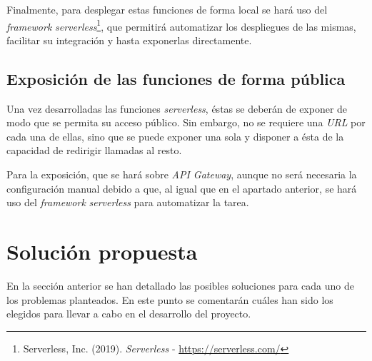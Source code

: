 \documentclass[11pt,spanish,listoffigures]{tfgetsinf}
\begin{document}
Finalmente, para desplegar estas funciones de forma local se hará uso del \textit{framework} \textit{serverless}\footnote{Serverless, Inc. (2019). \textit{Serverless} - \url{https://serverless.com/}}, que permitirá automatizar los despliegues de las mismas, facilitar su integración y hasta exponerlas directamente.

\subsection{Exposición de las funciones de forma pública}
\label{subsec:exposicion-funciones}

Una vez desarrolladas las funciones \textit{serverless}, éstas se deberán de exponer de modo que se permita su acceso público. Sin embargo, no se requiere una \textit{URL} por cada una de ellas, sino que se puede exponer una sola y disponer a ésta de la capacidad de redirigir llamadas al resto. 

Para la exposición, que se hará sobre \textit{API Gateway}, aunque no será necesaria la configuración manual debido a que, al igual que en el apartado anterior, se hará uso del \textit{framework} \textit{serverless} para automatizar la tarea.


\section{Solución propuesta}
\label{sec:solucion-propuesta}
En la sección anterior se han detallado las posibles soluciones para cada uno de los problemas planteados. En este punto se comentarán cuáles han sido los elegidos para llevar a cabo en el desarrollo del proyecto.
\end{document}
